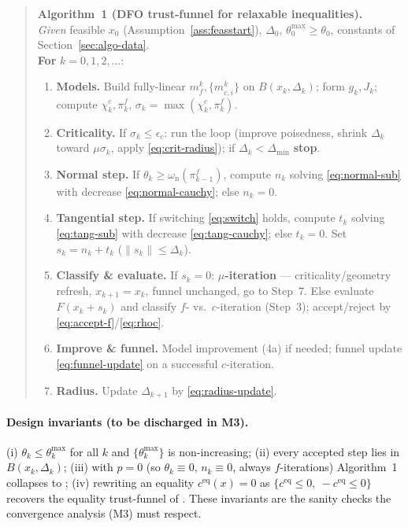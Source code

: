 \begin{quote}\small
\noindent\textbf{Algorithm~1 (DFO trust-funnel for relaxable inequalities).}\\
\textit{Given} feasible $x_0$ (Assumption~\ref{ass:feasstart}), $\Delta_0$,
$\theta_0^{\max}\ge\theta_0$, constants of Section~\ref{sec:algo-data}.\\
\textbf{For} $k=0,1,2,\dots$:
\begin{enumerate}\itemsep2pt
  \item \textbf{Models.} Build fully-linear $m_f^k,\{m_{c,i}^k\}$ on
        $B(x_k,\Delta_k)$; form $g_k,J_k$; compute $\chi_k^c,\pi_k^f$,
        $\sigma_k=\max(\chi_k^c,\pi_k^f)$.
  \item \textbf{Criticality.} If $\sigma_k\le\epsilon_c$: run the
         loop (improve poisedness, shrink $\Delta_k$ toward
        $\mu\sigma_k$, apply \eqref{eq:crit-radius}); if $\Delta_k<\Delta_{\min}$
        \textbf{stop}.
  \item \textbf{Normal step.} If $\theta_k\ge\omega_{\mathrm n}(\pi_{k-1}^f)$,
        compute $n_k$ solving \eqref{eq:normal-sub} with decrease
        \eqref{eq:normal-cauchy}; else $n_k=0$.
  \item \textbf{Tangential step.} If switching \eqref{eq:switch} holds, compute
        $t_k$ solving \eqref{eq:tang-sub} with decrease \eqref{eq:tang-cauchy};
        else $t_k=0$. Set $s_k=n_k+t_k$ ($\|s_k\|\le\Delta_k$).
  \item \textbf{Classify \& evaluate.} If $s_k=0$: \textbf{$\mu$-iteration} ---
        criticality/geometry refresh, $x_{k+1}=x_k$, funnel unchanged, go to Step~7.
        Else evaluate $F(x_k+s_k)$ and classify $f$- vs.\ $c$-iteration (Step~3);
        accept/reject by \eqref{eq:accept-f}/\eqref{eq:rhoc}.
  \item \textbf{Improve \& funnel.} Model improvement (4a) if needed; funnel
        update \eqref{eq:funnel-update} on a successful $c$-iteration.
  \item \textbf{Radius.} Update $\Delta_{k+1}$ by \eqref{eq:radius-update}.
\end{enumerate}
\end{quote}

\paragraph{Design invariants (to be discharged in M3).}
(i) $\theta_k\le\theta_k^{\max}$ for all $k$ and $\{\theta_k^{\max}\}$ is
non-increasing; (ii) every accepted step lies in $B(x_k,\Delta_k)$; (iii) with
$p=0$ (so $\theta_k\equiv0$, $n_k\equiv0$, always $f$-iterations) Algorithm~1
collapses to ; (iv) rewriting an equality
$c^{\mathrm{eq}}(x)=0$ as $\{c^{\mathrm{eq}}\le0,\ -c^{\mathrm{eq}}\le0\}$
recovers the equality trust-funnel of \citet{SampaioToint2015}. These invariants
are the sanity checks the convergence analysis (M3) must respect.
